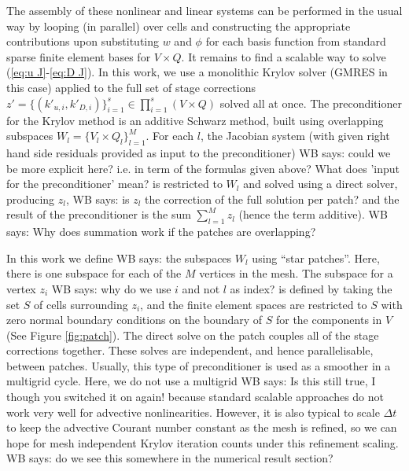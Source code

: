 \documentclass[a4paper, 12pt]{article}
\newcommand{\werner}[1]{{\color{magenta}WB says: #1}}
\begin{document}
The assembly of these nonlinear and linear systems can be performed in
the usual way by looping (in parallel) over cells and constructing the
appropriate contributions upon substituting $w$ and $\phi$ for each
basis function from standard sparse finite element bases for $V\times
Q$. It remains to find a scalable way to solve (\ref{eq:u J}-\ref{eq:D
  J}). In this work, we use a monolithic Krylov solver (GMRES in this
case) applied to the full set of stage corrections $z' = \{(k'_{u,i},
k'_{D,i})\}_{i=1}^s \in \prod_{i=1}^s(V\times Q)$ solved all at
once. The preconditioner for the Krylov method is an additive Schwarz
method, built using overlapping subspaces $W_l=\{V_l\times
Q_l\}_{l=1}^M$. For each $l$, the Jacobian system (with given right
hand side residuals provided as input to the preconditioner)
\werner{could we be more explicit here? i.e. in term of the formulas given above? What does 'input for the preconditioner' mean?}
is
restricted to $W_l$ and solved using a direct solver, producing $z_l$,
\werner{is $z_l$ the correction of the full solution per patch?}
and the result of the preconditioner is the sum $\sum_{l=1}^Mz_l$
(hence the term additive).
\werner{Why does summation work if the patches are overlapping?}

In this work we define \werner{the subspaces $W_l$} using ``star patches''.  Here, there
is one subspace for each of the $M$ vertices in the mesh.  The
subspace for a vertex $z_i$ \werner{why do we use $i$ and not $l$ as index?} is defined by taking the set $S$ of cells
surrounding $z_i$, and the finite element spaces are restricted to $S$
with zero normal boundary conditions on the boundary of $S$ for the
components in $V$ (See Figure \ref{fig:patch}). The direct solve on
the patch couples all of the stage corrections together. These
solves are independent, and hence parallelisable, between patches.
Usually, this
type of preconditioner is used as a smoother in a multigrid
cycle. Here, we do not use a multigrid \werner{Is this still true, I though you switched it on again!} because standard scalable
approaches do not work very well for advective
nonlinearities. However, it is also typical to scale $\Delta t$ to
keep the advective Courant number constant as the mesh is refined, so
we can hope for mesh independent Krylov iteration counts under this
refinement scaling.
\werner{do we see this somewhere in the numerical result section?}
\end{document}
